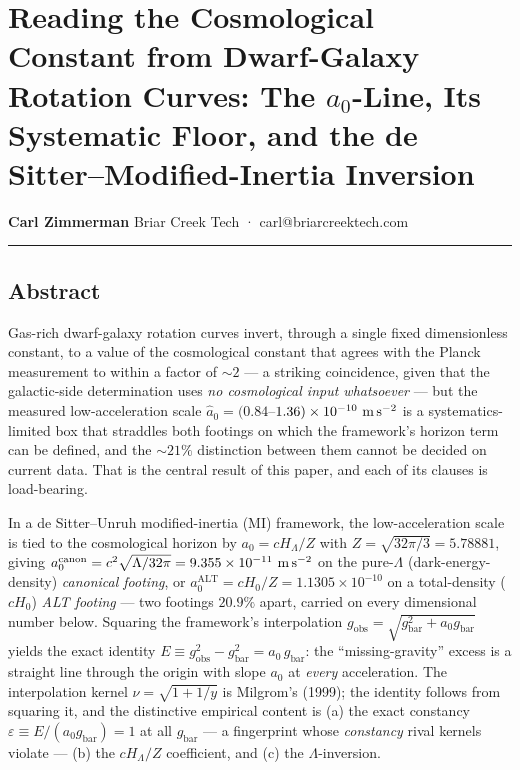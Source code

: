 \documentclass[
]{article}
\author{}
\date{}
\begin{document}
\section{\texorpdfstring{Reading the Cosmological Constant from
Dwarf-Galaxy Rotation Curves: The \(a_0\)-Line, Its Systematic Floor,
and the de Sitter--Modified-Inertia
Inversion}{Reading the Cosmological Constant from Dwarf-Galaxy Rotation Curves: The a\_0-Line, Its Systematic Floor, and the de Sitter--Modified-Inertia Inversion}}\label{reading-the-cosmological-constant-from-dwarf-galaxy-rotation-curves-the-a_0-line-its-systematic-floor-and-the-de-sittermodified-inertia-inversion}

\textbf{Carl Zimmerman} Briar Creek Tech · carl@briarcreektech.com

\begin{center}\rule{0.5\linewidth}{0.5pt}\end{center}

\subsection{Abstract}\label{abstract}

Gas-rich dwarf-galaxy rotation curves invert, through a single fixed
dimensionless constant, to a value of the cosmological constant that
agrees with the Planck measurement to within a factor of \(\sim2\) --- a
striking coincidence, given that the galactic-side determination uses
\emph{no cosmological input whatsoever} --- but the measured
low-acceleration scale
\(\hat a_0=(0.84\)--\(1.36)\times10^{-10}\ {\rm m\,s^{-2}}\) is a
systematics-limited box that straddles both footings on which the
framework's horizon term can be defined, and the \(\sim21\%\)
distinction between them cannot be decided on current data. That is the
central result of this paper, and each of its clauses is load-bearing.

In a de Sitter--Unruh modified-inertia (MI) framework, the
low-acceleration scale is tied to the cosmological horizon by
\(a_0=cH_\Lambda/Z\) with \(Z=\sqrt{32\pi/3}=5.78881\), giving
\(a_0^\mathrm{canon}=c^2\sqrt{\Lambda/32\pi}=9.355\times10^{-11}\ {\rm m\,s^{-2}}\)
on the pure-\(\Lambda\) (dark-energy-density) \emph{canonical footing},
or \(a_0^\mathrm{ALT}=cH_0/Z=1.1305\times10^{-10}\) on a total-density
(\(cH_0\)) \emph{ALT footing} --- two footings \(20.9\%\) apart, carried
on every dimensional number below. Squaring the framework's
interpolation \(g_\mathrm{obs}=\sqrt{g_\mathrm{bar}^2+a_0 g_\mathrm{bar}}\)
yields the exact identity
\(E\equiv g_\mathrm{obs}^2-g_\mathrm{bar}^2=a_0\,g_\mathrm{bar}\): the
``missing-gravity'' excess is a straight line through the origin with
slope \(a_0\) at \emph{every} acceleration. The interpolation kernel
\(\nu=\sqrt{1+1/y}\) is Milgrom's (1999); the identity follows from
squaring it, and the distinctive empirical content is (a) the exact
constancy \(\varepsilon\equiv E/(a_0 g_\mathrm{bar})=1\) at all
\(g_\mathrm{bar}\) --- a fingerprint whose \emph{constancy} rival kernels
violate --- (b) the \(cH_\Lambda/Z\) coefficient, and (c) the
\(\Lambda\)-inversion.
\end{document}

